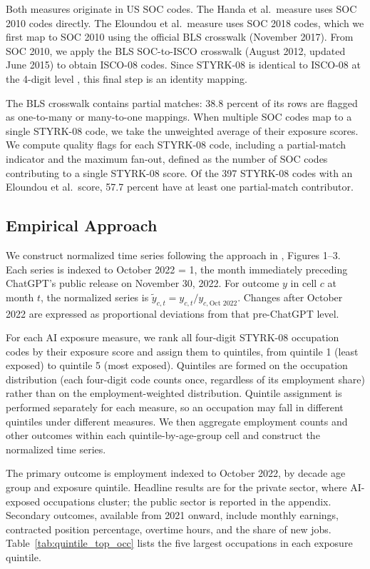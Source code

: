 \documentclass[12pt]{article}
\begin{document}
Both measures originate in US SOC codes. The Handa et al.\ measure uses SOC 2010 codes directly. The Eloundou et al.\ measure uses SOC 2018 codes, which we first map to SOC 2010 using the official BLS crosswalk (November 2017). From SOC 2010, we apply the BLS SOC-to-ISCO crosswalk (August 2012, updated June 2015) to obtain ISCO-08 codes. Since STYRK-08 is identical to ISCO-08 at the 4-digit level \citep{ssb2011styrk}, this final step is an identity mapping.

The BLS crosswalk contains partial matches: 38.8 percent of its rows are flagged as one-to-many or many-to-one mappings. When multiple SOC codes map to a single STYRK-08 code, we take the unweighted average of their exposure scores. We compute quality flags for each STYRK-08 code, including a partial-match indicator and the maximum fan-out, defined as the number of SOC codes contributing to a single STYRK-08 score. Of the 397 STYRK-08 codes with an Eloundou et al.\ score, 57.7 percent have at least one partial-match contributor.


\subsection{Empirical Approach}\label{sec:data:approach}

We construct normalized time series following the approach in \citet{brynjolfsson2025}, Figures 1--3. Each series is indexed to October 2022 = 1, the month immediately preceding ChatGPT's public release on November 30, 2022. For outcome $y$ in cell $c$ at month $t$, the normalized series is $\tilde{y}_{c,t} = y_{c,t} / y_{c,\text{Oct } 2022}$. Changes after October 2022 are expressed as proportional deviations from that pre-ChatGPT level.

For each AI exposure measure, we rank all four-digit STYRK-08 occupation codes by their exposure score and assign them to quintiles, from quintile 1 (least exposed) to quintile 5 (most exposed). Quintiles are formed on the occupation distribution (each four-digit code counts once, regardless of its employment share) rather than on the employment-weighted distribution. Quintile assignment is performed separately for each measure, so an occupation may fall in different quintiles under different measures. We then aggregate employment counts and other outcomes within each quintile-by-age-group cell and construct the normalized time series.

The primary outcome is employment indexed to October 2022, by decade age group and exposure quintile. Headline results are for the private sector, where AI-exposed occupations cluster; the public sector is reported in the appendix. Secondary outcomes, available from 2021 onward, include monthly earnings, contracted position percentage, overtime hours, and the share of new jobs. Table~\ref{tab:quintile_top_occ} lists the five largest occupations in each exposure quintile.
\end{document}
